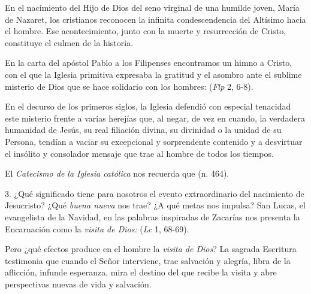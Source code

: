 En el nacimiento del Hijo de Dios del seno virginal de una humilde joven, María de Nazaret, los cristianos reconocen la infinita condescendencia del Altísimo hacia el hombre. Ese acontecimiento, junto con la muerte y resurrección de Cristo, constituye el culmen de la historia.

En la carta del apóstol Pablo a los Filipenses encontramos un himno a Cristo, con el que la Iglesia primitiva expresaba la gratitud y el asombro ante el sublime misterio de Dios que se hace solidario con los hombres:  (\emph{Flp} 2, 6-8).

En el decurso de los primeros siglos, la Iglesia defendió con especial tenacidad este misterio frente a varias herejías que, al negar, de vez en cuando, la verdadera humanidad de Jesús, su real filiación divina, su divinidad o la unidad de su Persona, tendían a vaciar su excepcional y sorprendente contenido y a desvirtuar el insólito y consolador mensaje que trae al hombre de todos los tiempos.

El \emph{Catecismo de la Iglesia católica} nos recuerda que  (n. 464).

3. ¿Qué significado tiene para nosotros el evento extraordinario del nacimiento de Jesucristo? ¿Qué \emph{buena nueva} nos trae? ¿A qué metas nos impulsa? San Lucas, el evangelista de la Navidad, en las palabras inspiradas de Zacarías nos presenta la Encarnación como la \emph{visita de Dios:}  (\emph{Lc} 1, 68-69).

Pero ¿qué efectos produce en el hombre la \emph{visita de Dios}? La sagrada Escritura testimonia que cuando el Señor interviene, trae salvación y alegría, libra de la aflicción, infunde esperanza, mira el destino del que recibe la visita y abre perspectivas nuevas de vida y salvación.

